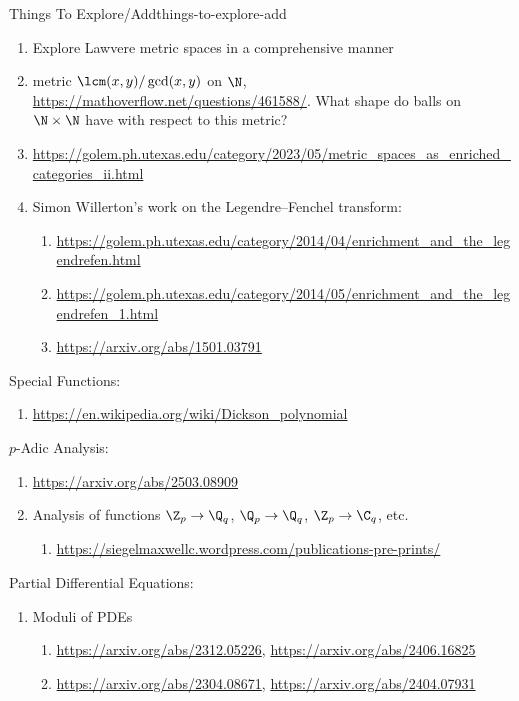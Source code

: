 \begin{remark}{Things To Explore/Add}{things-to-explore-add}
\begin{enumerate}
        \item Explore Lawvere metric spaces in a comprehensive manner
        \item metric $\lcm(x,y)/\gcd(x,y)$ on $\N$, \url{https://mathoverflow.net/questions/461588/}. What shape do balls on $\N\times\N$ have with respect to this metric?
        \item \url{https://golem.ph.utexas.edu/category/2023/05/metric_spaces_as_enriched_categories_ii.html}
        \item Simon Willerton's work on the Legendre--Fenchel transform:
            \begin{enumerate}
                \item \url{https://golem.ph.utexas.edu/category/2014/04/enrichment_and_the_legendrefen.html}
                \item \url{https://golem.ph.utexas.edu/category/2014/05/enrichment_and_the_legendrefen_1.html}
                \item \url{https://arxiv.org/abs/1501.03791}
            \end{enumerate}
    \end{enumerate}
    Special Functions:
    \begin{enumerate}
        \item \url{https://en.wikipedia.org/wiki/Dickson_polynomial}
    \end{enumerate}
    $p$-Adic Analysis:
    \begin{enumerate}
        \item \url{https://arxiv.org/abs/2503.08909}
        \item Analysis of functions $\Z_{p}\to\Q_{q}$, $\Q_{p}\to\Q_{q}$, $\Z_{p}\to\C_{q}$, etc.
            \begin{enumerate}
                \item \url{https://siegelmaxwellc.wordpress.com/publications-pre-prints/}
            \end{enumerate}
    \end{enumerate}
    Partial Differential Equations:
    \begin{enumerate}
        \item Moduli of PDEs
            \begin{enumerate}
                \item \url{https://arxiv.org/abs/2312.05226}, \url{https://arxiv.org/abs/2406.16825}
                \item \url{https://arxiv.org/abs/2304.08671}, \url{https://arxiv.org/abs/2404.07931}

\end{enumerate}
\end{enumerate}
\end{remark}
